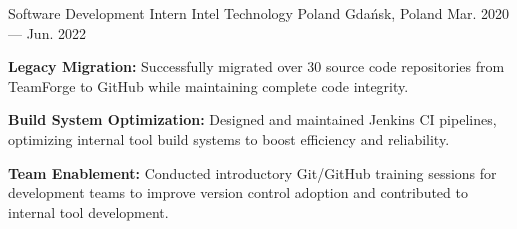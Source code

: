 \begin{cventries}
    \cventry
    {Software Development Intern} %
    {Intel Technology Poland} %
    {Gdańsk, Poland} %
    {Mar. 2020 --- Jun. 2022} %
    {
        \begin{cvitems} %
        \item \textbf{Legacy Migration:} Successfully migrated over 30 source code repositories from TeamForge to GitHub while maintaining complete code integrity.
        \item \textbf{Build System Optimization:} Designed and maintained Jenkins CI pipelines, optimizing internal tool build systems to boost efficiency and reliability.
        \item \textbf{Team Enablement:} Conducted introductory Git/GitHub training sessions for development teams to improve version control adoption and contributed to internal tool development.
        \end{cvitems}
    }

\end{cventries}
